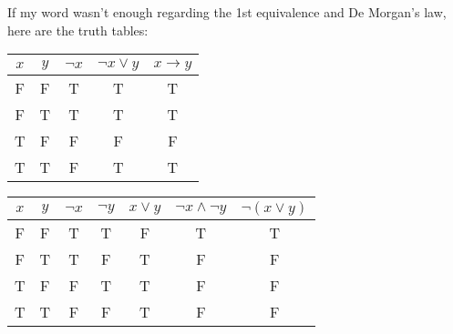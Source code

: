 \documentclass{article}
\begin{document}
If my word wasn't enough regarding the 1st equivalence and De Morgan's law, here are the truth tables:

\begin{center}
\begin{tabular}{ccccc}
$x$ & $y$ & $\neg x$ & $\neg x\vee y$ & $x\rightarrow y$\\
\midrule
F & F & T & T & T\\
F & T & T & T & T\\
T & F & F & F & F\\
T & T & F & T & T\\
\end{tabular}

\begin{tabular}{ccccccc}
$x$ & $y$ & $\neg x$ & $\neg y$ & $x\vee y$ & $\neg x\wedge\neg y$ & $\neg(x\vee y)$\\
\midrule
F & F & T & T & F & T & T\\
F & T & T & F & T & F & F\\
T & F & F & T & T & F & F\\
T & T & F & F & T & F & F\\
\end{tabular}
\end{center}
\end{document}
